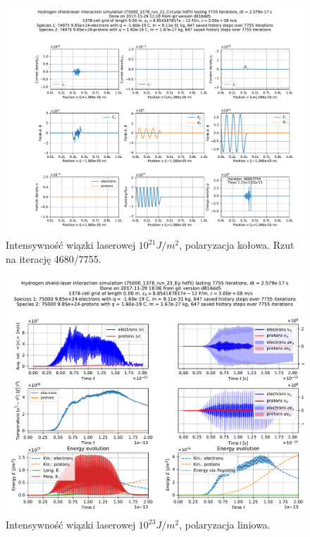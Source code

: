 \begin{figure}[h!]
  \includegraphics[width=\textwidth]{Images/75000_1378_run_21_Circular_004680}
  \caption{Intensywność wiązki laserowej $10^{21} J/m^2$, polaryzacja kołowa. Rzut na iterację 4680/7755.\label{fig:laser-21-Circular-snapshot}}
\end{figure}

\begin{figure}[h!]
  \includegraphics[width=\textwidth]{Images/75000_1378_run_23_Ey}
  \caption{Intensywność wiązki laserowej $10^{23} J/m^2$, polaryzacja liniowa.\label{fig:laser-23-Ey}}
\end{figure}

